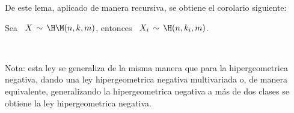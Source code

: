 De este lema, aplicado de manera recursiva, se obtiene el corolario siguiente:
%
\begin{corolario}\label{Cor:MP:MarginalMultinomial}
%
  Sea  \ $X  \,  \sim \,  \H\M(n,k,m)$, entonces  \  $\displaystyle X_i  \, \sim  \,
  \H(n,k_i,m)$.
\end{corolario}





\

Nota: esta  ley se  generaliza de  la misma manera  que para  la hipergeometrica
negativa,  dando una  ley  hipergeometrica negativa  multivariada  o, de  manera
equivalente, generalizando la hipergeometrica negativa  a m\'as de dos clases se
obtiene la ley hipergeometrica negativa. 
